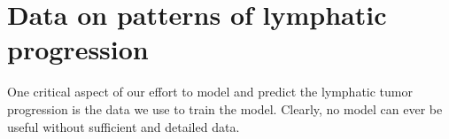 \documentclass[\relativeRoot/main.tex]{subfiles}
\begin{document}
\chapter{Data on patterns of lymphatic progression}
\label{chap:dataset}

One critical aspect of our effort to model and predict the lymphatic tumor progression is the data we use to train the model. Clearly, no model can ever be useful without sufficient and detailed data.
\end{document}
